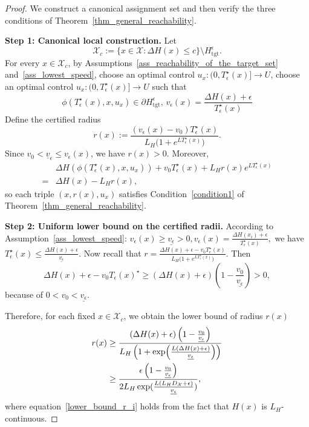 \documentclass[letterpaper, 10 pt, conference]{ieeeconf}
\newcommand{\X}{\mathcal{X}}
\newcommand{\tgt}{\mathrm{tgt}}
\begin{document}
\begin{proof}
We construct a canonical assignment set and then verify the three conditions of Theorem~\ref{thm_general_reachability}.

\medskip
\noindent\textbf{Step 1: Canonical local construction.}
Let 
\[
\X_c:=\{x\in \X:\Delta H(x)\le c\}\setminus H_{\tgt}^\epsilon.
\]
For every $x \in \X_c$, by Assumptions~\ref{ass_reachability_of_the_target_set}
and~\ref{ass_lowest_speed}, choose an optimal control $u_x:(0,T_\epsilon^\star(x)] \to U$, choose an optimal control $u_x:(0, T_\epsilon^\star(x)] \to U$ such that 
\[
\phi(T_\epsilon^\star(x),x,u_x) \in \partial H_{\tgt}^\epsilon, \,
v_\epsilon(x) = \frac{\Delta H(x) + \epsilon}{T_\epsilon^\star(x)}
\]
Define the certified radius
\[
r(x)
:=
\frac{(v_\epsilon(x)-v_0) T_\epsilon^\star(x)}
{L_H\bigl(1+e^{LT_\epsilon^\star(x)}\bigr)}.
\]
Since $v_0<\underline v_\epsilon\le v_\epsilon(x)$, we have $r(x)>0$.
Moreover,
\begin{align*}
 & \Delta H(\phi(T_\epsilon^\star(x),x,u_x))
+v_0T_\epsilon^\star(x)
+L_Hr(x)e^{LT_\epsilon^\star(x)}\\
= &
\Delta H(x)-L_Hr(x),
\end{align*}
so each triple $(x,r(x),u_x)$ satisfies Condition~\ref{condition1} of
Theorem~\ref{thm_general_reachability}.

\noindent\textbf{Step 2: Uniform lower bound on the certified radii.}
According to Assumption~\ref{ass_lowest_speed}: $v_\epsilon(x)\geq \underline{v_\epsilon}>0,
v_\epsilon(x)=\frac{\Delta H(x_i)+\epsilon}{T_\epsilon^\star(x)},$
we have $T_\epsilon^\star(x) \leq \frac{\Delta H(x)+\epsilon}{\underline{v_\epsilon}}$.
Now recall that $r
=
\frac{\Delta H(x)+\epsilon-v_0 T_\epsilon^\star(x)}
{L_H\bigl(1+e^{LT_\epsilon^\star(x)}\bigr)}$. Then
\[
\Delta H(x)+\epsilon-v_0 T_\epsilon(x)^\star
\geq
(\Delta H(x)+\epsilon)\left(1-\frac{v_0}{\underline{v_\epsilon}}\right)> 0,
\]
because of 
$0<v_0<\underline{v_\epsilon}$.

Therefore, for each fixed $x \in \X_c$, we obtain the lower bound of radius $r(x)$
\begin{align}
r(x) & 
\geq
\frac{
(\Delta H(x)+\epsilon)\left(1-\frac{v_0}{\underline{v_\epsilon}}\right)
}{
L_H\left(
1+\exp\!\left(\frac{L(\Delta H(x)+\epsilon)}{\underline{v_\epsilon}}\right)
\right)
} \notag \\
& \ge \frac{
\epsilon \left(1-\frac{v_0}{\underline{v_\epsilon}}\right)
}{2 L_H \exp(\frac{L(L_H D_{\mathcal{X}} +\epsilon)}{\underline{v_\epsilon}})
}, \label{lower_bound_r_i}
\end{align}
where equation~\eqref{lower_bound_r_i} holds from the fact that $H(x)$ is $L_H$-continuous.


\end{proof}
\end{document}

